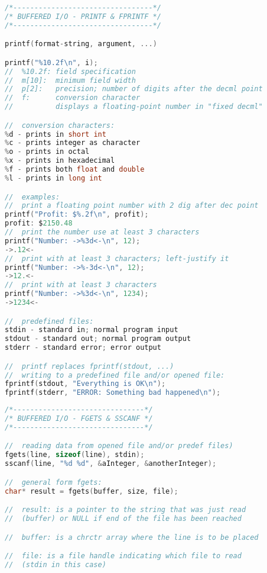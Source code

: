 \documentclass[8pt]{extarticle}
\begin{document}
\begin{small}
\begin{multicols}{2}
\begin{lstlisting}[language=C]
\end{lstlisting}

\begin{lstlisting}[language=C]
/*---------------------------------*/
/* BUFFERED I/O - PRINTF & FPRINTF */
/*---------------------------------*/

printf(format-string, argument, ...)

printf("%10.2f\n", i);
//  %10.2f: field specification
//  m[10]: 	minimum field width
//  p[2]: 	precision; number of digits after the decml point
//  f: 		conversion character
//	   		displays a floating-point number in "fixed decml"

//  conversion characters:
%d - prints in short int
%c - prints integer as character
%o - prints in octal
%x - prints in hexadecimal
%f - prints both float and double
%l - prints in long int

//  examples:
//  print a floating point number with 2 dig after dec point
printf("Profit: $%.2f\n", profit);
profit: $2150.48
//  print the number use at least 3 characters
printf("Number: ->%3d<-\n", 12);
->.12<-
//  print with at least 3 characters; left-justify it
printf("Number: ->%-3d<-\n", 12);
->12.<-
//  print with at least 3 characters
printf("Number: ->%3d<-\n", 1234);
->1234<-

//  predefined files:
stdin - standard in; normal program input
stdout - standard out; normal program output
stderr - standard error; error output

//  printf replaces fprintf(stdout, ...)
//  writing to a predefined file and/or opened file:
fprintf(stdout, "Everything is OK\n");
fprintf(stderr, "ERROR: Something bad happened\n");
\end{lstlisting}

\begin{lstlisting}[language=C]
/*-------------------------------*/
/* BUFFERED I/O - FGETS & SSCANF */
/*-------------------------------*/

//  reading data from opened file and/or predef files)
fgets(line, sizeof(line), stdin);
sscanf(line, "%d %d", &aInteger, &anotherInteger);

//  general form fgets:
char* result = fgets(buffer, size, file);

//  result: is a pointer to the string that was just read 
//  (buffer) or NULL if end of the file has been reached

//  buffer: is a chrctr array where the line is to be placed

//  file: is a file handle indicating which file to read
//  (stdin in this case)


\end{lstlisting}
\end{multicols}
\end{small}
\end{document}
